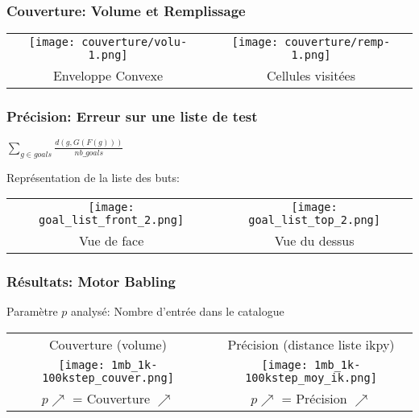 \documentclass[french]{beamer}
\begin{document}
\begin{frame}
    \frametitle{Couverture: Volume et Remplissage}
    
    \begin{tabular}{c c}
        \texttt{[image: couverture/volu-1.png]}

        &

        \texttt{[image: couverture/remp-1.png]}

        \\

        Enveloppe Convexe

        &

        Cellules visitées

    \end{tabular}

\end{frame}


\begin{frame}
    \frametitle{Précision: Erreur sur une liste de test}
    
    \huge$\sum\limits_{g \in goals} \frac{ d( g, G(  F(  g  )  ) )}
    {nb\_goals}$
    
    \vfill
    \center \normalsize
    Représentation de la liste des buts:

    \raggedleft
    \begin{tabular}{c c}
        \texttt{[image: goal\_list\_front\_2.png]} &
        \texttt{[image: goal\_list\_top\_2.png]}
        \\
        Vue de face & Vue du dessus
    \end{tabular}
\end{frame}


\begin{frame}
    \frametitle{Résultats: Motor Babling}

    Paramètre $p$ analysé: Nombre d'entrée dans le catalogue
    \vfill

    \begin{tabular}{c c}
        Couverture (volume) & Précision (distance liste ikpy)
        \\
        \texttt{[image: 1mb\_1k-100kstep\_couver.png]} &
        \texttt{[image: 1mb\_1k-100kstep\_moy\_ik.png]}
        \\
        $p \nearrow$ = Couverture \color{green}$\nearrow$
        &
        $p \nearrow$ = Précision \color{green}$\nearrow$
    \end{tabular}
\end{frame}
\end{document}
